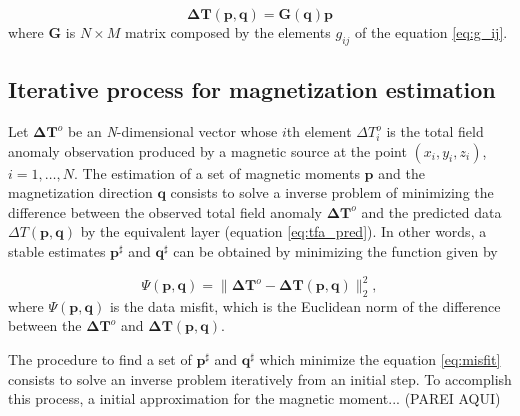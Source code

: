 \begin{equation}
 \mathbf{\Delta T} (\mathbf{p}, \mathbf{q}) = \mathbf{G}(\mathbf{q}) \mathbf{p}
\label{eq:tfa_pred}
\end{equation}
where $\mathbf{G}$ is $N \times M$ matrix composed by the elements $g_{ij}$ of the equation \ref{eq:g_ij}.


\subsection{Iterative process for magnetization estimation}

Let $\mathbf{\Delta T}^o$ be an \textit{N}-dimensional vector whose $i$th element $\Delta T_i^o$ is the total field anomaly observation produced by a magnetic source at the point $(x_i,y_i,z_i)$, $i = 1, \ldots, N$. The estimation of a set of magnetic moments $\mathbf{p}$ and the magnetization direction $\mathbf{q}$ consists to solve a inverse problem of minimizing the difference between the observed total field anomaly $\mathbf{\Delta T}^o$ and the predicted data $\Delta T (\mathbf{p}, \mathbf{q})$ by the equivalent layer (equation \ref{eq:tfa_pred}). In other words, a stable estimates $\mathbf{p}^\sharp$ and $\mathbf{q}^\sharp$ can be obtained by minimizing the function given by

\begin{equation}
\Psi(\mathbf{p}, \mathbf{q}) =  \parallel \mathbf{\Delta T}^o - \mathbf{\Delta T} (\mathbf{p}, \mathbf{q}) \parallel_{2}^{2},
\label{eq:misfit}
\end{equation}
where $\Psi(\mathbf{p}, \mathbf{q})$ is the data misfit, which is the Euclidean norm of the difference between the $\mathbf{\Delta T}^o$ and $\mathbf{\Delta T} (\mathbf{p}, \mathbf{q})$.

The procedure to find a set of $\mathbf{p}^\sharp$ and $\mathbf{q}^\sharp$ which minimize the equation \ref{eq:misfit} consists to solve an inverse problem iteratively from an initial step. To accomplish this process, a initial approximation for the magnetic moment... (PAREI AQUI)   







